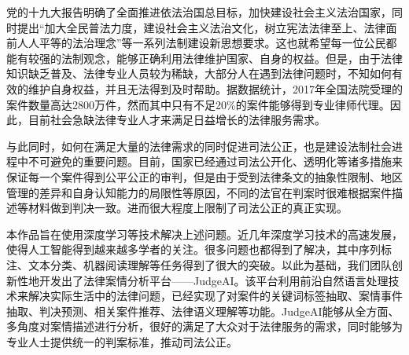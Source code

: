 \begin{cabstract}
  党的十九大报告明确了全面推进依法治国总目标，加快建设社会主义法治国家，同时提出“加大全民普法力度，建设社会主义法治文化，树立宪法法律至上、法律面前人人平等的法治理念”等一系列法制建设新思想要求。这也就希望每一位公民都能有较强的法制观念，能够正确利用法律维护国家、自身的权益。但是，由于法律知识缺乏普及、法律专业人员较为稀缺，大部分人在遇到法律问题时，不知如何有效的维护自身权益，并且无法得到及时帮助。据数据统计，2017年全国法院受理的案件数量高达2800万件，然而其中只有不足20\%的案件能够得到专业律师代理。因此，目前社会急缺法律专业人才来满足日益增长的法律服务需求。
  
	与此同时，如何在满足大量的法律需求的同时促进司法公正，也是建设法制社会进程中不可避免的重要问题。目前，国家已经通过司法公开化、透明化等诸多措施来保证每一个案件得到公平公正的审判，但是由于受到法律条文的抽象性限制、地区管理的差异和自身认知能力的局限性等原因，不同的法官在判案时很难根据案件描述等材料做到判决一致。进而很大程度上限制了司法公正的真正实现。
	
	本作品旨在使用深度学习等技术解决上述问题。近几年深度学习技术的高速发展，使得人工智能得到越来越多学者的关注。很多问题也都得到了解决，其中序列标注、文本分类、机器阅读理解等任务得到了很大的突破。以此为基础，我们团队创新性地开发出了法律案情分析平台——JudgeAI。该平台利用前沿自然语言处理技术来解决实际生活中的法律问题，已经实现了对案件的关键词标签抽取、案情事件抽取、判决预测、相关案件推荐、法律语义理解等功能。JudgeAI能够从全方面、多角度对案情描述进行分析，很好的满足了大众对于法律服务的需求，同时能够为专业人士提供统一的判案标准，推动司法公正。

\end{cabstract}


\begin{eabstract}
	
\end{eabstract}



